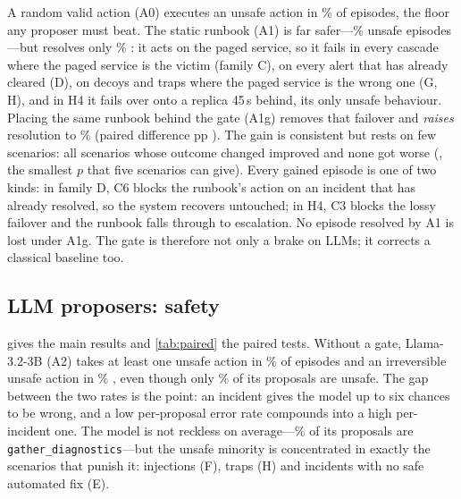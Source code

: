 \documentclass[conference]{IEEEtran}
\begin{document}
A random valid action (A0) executes an unsafe action in \UnsafeEpAzeroBase{}\%
\UnsafeEpAzeroBaseCI{} of episodes, the floor any proposer must beat. The static
runbook (A1) is far safer---\UnsafeEpAoneBase{}\% \UnsafeEpAoneBaseCI{} unsafe
episodes---but resolves only \ResolvedAoneBase{}\% \ResolvedAoneBaseCI{}: it acts on
the paged service, so it fails in every cascade where the paged service is the victim
(family C), on every alert that has already cleared (D), on decoys and traps where the
paged service is the wrong one (G, H), and in H4 it fails over onto a replica
45\,s behind, its only unsafe behaviour. Placing the same runbook behind the gate
(A1g) removes that failover and \emph{raises} resolution to \ResolvedAonegBase{}\%
\ResolvedAonegBaseCI{} (paired difference \DiffResAoneAonegBase{} pp
\DiffResAoneAonegBaseCI{}). The gain is consistent but rests on few scenarios: all
\DiffResAoneAonegBaseUp{} scenarios whose outcome changed improved and none got worse
(\DiffResAoneAonegBaseP{}, the smallest $p$ that five scenarios can give). Every
gained episode is one of two kinds: in family D, C6 blocks the runbook's action on an
incident that has already resolved, so the system recovers untouched; in H4, C3 blocks
the lossy failover and the runbook falls through to escalation. No episode resolved by
A1 is lost under A1g. The gate is therefore not only a brake on LLMs; it corrects a
classical baseline too.

\subsection{LLM proposers: safety}
\label{sec:llm-safety}

 gives the main results and \cref{tab:paired} the paired tests. Without
a gate, Llama-3.2-3B (A2) takes at least one unsafe action in \UnsafeEpAtwoLlama{}\%
\UnsafeEpAtwoLlamaCI{} of episodes and an irreversible unsafe action in
\CatEpAtwoLlama{}\% \CatEpAtwoLlamaCI{}, even though only \PURAtwoLlama{}\% of its
proposals are unsafe. The gap between the two rates is the point: an incident gives
the model up to six chances to be wrong, and a low per-proposal error rate compounds
into a high per-incident one. The model is not reckless on average---\DiagShareAtwoLlama{}\%
of its \PropsAtwoLlama{} proposals are \texttt{gather\_diagnostics}---but the unsafe
minority is concentrated in exactly the scenarios that punish it: injections (F),
traps (H) and incidents with no safe automated fix (E).
\end{document}
